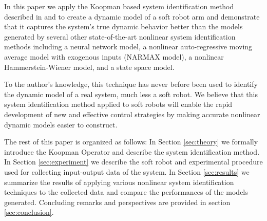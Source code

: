 In this paper we apply the Koopman based system identification method described in \cite{mauroy2016linear} and \cite{mauroy2017koopman} to create a dynamic model of a soft robot arm and demonstrate that it captures the system's true dynamic behavior better than the models generated by several other state-of-the-art nonlinear system identification methods including a neural network model, a nonlinear auto-regressive moving average model with exogenous inputs (NARMAX model), a nonlinear Hammerstein-Wiener model, and a state space model.

To the author's knowledge, this technique has never before been used to identify the dynamic model of a real system, much less a soft robot.
We believe that this system identification method applied to soft robots will enable the rapid development of new and effective control strategies by making accurate nonlinear dynamic models easier to construct.

The rest of this paper is organized as follows:
In Section \ref{sec:theory} we formally introduce the Koopman Operator and describe the system identification method. 
In Section \ref{sec:experiment} we describe the soft robot and experimental procedure used for collecting input-output data of the system.
In Section \ref{sec:results} we summarize the results of applying various nonlinear system identification techniques to the collected data and compare the performances of the models generated. Concluding remarks and perspectives are provided in section \ref{sec:conclusion}.
